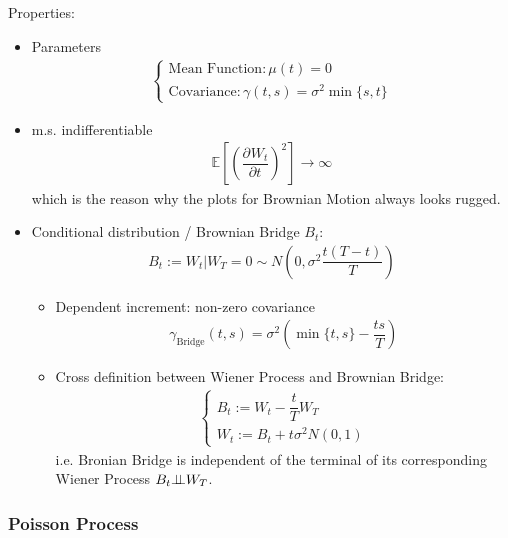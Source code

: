 Properties:
\begin{itemize}[topsep=2pt,itemsep=0pt]
        \item Parameters
        \begin{align}
            \begin{cases}
                \text{Mean Function}:\mu (t)=0\\
                \text{Covariance}:\gamma (t,s)=\sigma ^2 \min\{s,t\} 
            \end{cases} 
        \end{align}
        \item m.s. indifferentiable
        \begin{align}
            \mathbb{E}\left[ \left(\dfrac{\partial^{} W_t}{\partial t^{}}\right)^2 \right]\to \infty  
        \end{align}
        which is the reason why the plots for Brownian Motion always looks rugged.
        \item Conditional distribution / Brownian Bridge $ B_t $:
        \begin{align}
            B_t := W_t|W_T=0 \sim N(0,\sigma ^2\dfrac{t(T-t)}{T})
        \end{align}
        \begin{itemize}[topsep=2pt,itemsep=0pt]
            \item Dependent increment: non-zero covariance
        \begin{align}
            \gamma_\mathrm{Bridge}  (t,s) = \sigma ^2\left(\min\{t,s\}-\dfrac{ts}{T}\right)
        \end{align}
            \item Cross definition between Wiener Process and Brownian Bridge:
            \begin{align}
                \begin{cases}
                    B_t:=W_t-\dfrac{t}{T}W_T\\
                    W_t:=B_t+t \sigma ^2 N(0,1) 
                \end{cases}
            \end{align}
            i.e. Bronian Bridge is independent of the terminal of its corresponding Wiener Process $ B_t\bot\!\!\!\bot W_T $.
        \end{itemize}
\end{itemize}

\subsubsection{Poisson Process}
\hypertarget{PoissonProcess}{}

